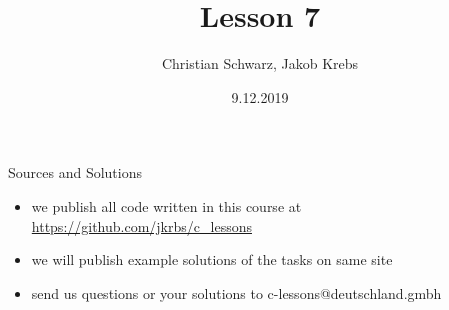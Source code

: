 \documentclass[10pt,graphics,aspectratio=169,table]{beamer}
\title{Lesson 7}
\author{Christian Schwarz, Jakob Krebs}
\date{9.12.2019}
\begin{document}
\maketitle

\begin{frame}{Sources and Solutions}
    \begin{itemize}
        \item we publish all code written in this course at \url{https://github.com/jkrbs/c_lessons}
        \item we will publish example solutions of the tasks on same site
        \item send us questions or your solutions to c-lessons@deutschland.gmbh
    \end{itemize}
\end{frame}
\end{document}
